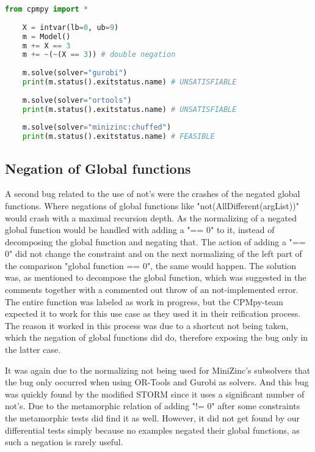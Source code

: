 \label{lst:Bug:DoubleNot}
\begin{lstlisting}[language=python, caption={The "double not"-bug.}]
	from cpmpy import *
	
	X = intvar(lb=0, ub=9)
	m = Model()
	m += X == 3
	m += ~(~(X == 3)) # double negation 
	
	m.solve(solver="gurobi")
	print(m.status().exitstatus.name) # UNSATISFIABLE
	
	m.solve(solver="ortools")
	print(m.status().exitstatus.name) # UNSATISFIABLE
	
	m.solve(solver="minizinc:chuffed")
	print(m.status().exitstatus.name) # FEASIBLE	
\end{lstlisting}

\subsection{Negation of Global functions}
\label{res:bug:NegatedGlobal}
A second bug related to the use of not's were the crashes of the negated global functions. Where negations of global functions like "not(AllDifferent(argList))" would crash with a maximal recursion depth. As the normalizing of a negated global function would be handled with adding a "== 0" to it, instead of decomposing the global function and negating that. The action of adding a "== 0" did not change the constraint and on the next normalizing of the left part of the comparison "global function == 0", the same would happen. The solution was, as mentioned to decompose the global function, which was suggested in the comments together with a commented out throw of an not-implemented error. The entire function was labeled as work in progress, but the CPMpy-team expected it to work for this use case as they used it in their reification process. The reason it worked in this process was due to a shortcut not being taken, which the negation of global functions did do, therefore exposing the bug only in the latter case.

It was again due to the normalizing not being used for MiniZinc's subsolvers that the bug only occurred when using OR-Tools and Gurobi as solvers. And this bug was quickly found by the modified STORM since it uses a significant number of not's. Due to the metamorphic relation of adding "!= 0" after some constraints the metamorphic tests did find it as well. However, it did not get found by our differential tests simply because no examples negated their global functions, as such a negation is rarely useful. 


